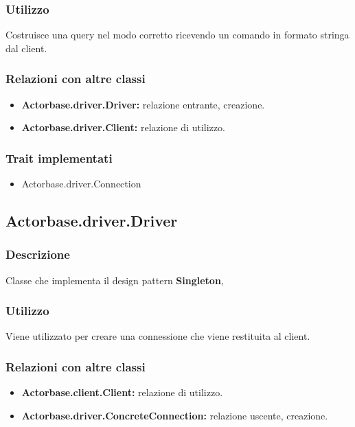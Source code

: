 \documentclass[a4paper]{article}
\begin{document}
			\subsubsection{Utilizzo}
				Costruisce una query nel modo corretto ricevendo un comando in formato stringa dal client.
				
			\subsubsection{Relazioni con altre classi}
				\begin{itemize}
					\item \textbf{Actorbase.driver.Driver:} relazione entrante, creazione.
					\item \textbf{Actorbase.driver.Client:} relazione di utilizzo.
				\end{itemize}
			\subsubsection{Trait implementati}
				\begin{itemize}
					\item Actorbase.driver.Connection
				\end{itemize}
				
		\subsection{Actorbase.driver.Driver}
			\subsubsection{Descrizione}
				Classe che implementa il design pattern \textbf{Singleton}, 
				
			\subsubsection{Utilizzo}
				Viene utilizzato per creare una connessione che viene restituita al client. 
				
			\subsubsection{Relazioni con altre classi}
				\begin{itemize}
					\item \textbf{Actorbase.client.Client:} relazione di utilizzo.
					\item \textbf{Actorbase.driver.ConcreteConnection:} relazione uscente, creazione.
				\end{itemize}
		
\end{document}
